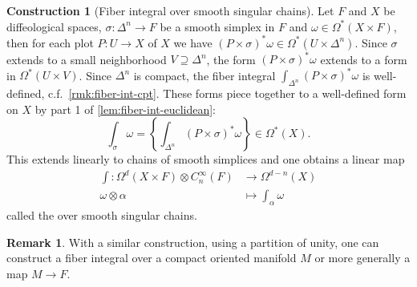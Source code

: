 \documentclass{scrartcl}
\let\emph\relax
\theoremstyle{plain}
\theoremstyle{definition}
\newtheorem{remark}[theorem]{Remark}
\newtheorem{construction}[theorem]{Construction}
\newcommand{\R}{\mathbb R}
\renewcommand{\subset}{\subseteq}
\renewcommand{\supset}{\supseteq}
\begin{document}


\begin{construction}[Fiber integral over smooth singular chains]
    Let $F$ and $X$ be diffeological spaces, $\sigma\colon\Delta^n\to F$ be a smooth simplex in $F$ and $\omega\in\Omega^*(X\times F)$, then for each plot $P\colon U\to X$ of $X$ we have $(P\times\sigma)^*\omega\in\Omega^*(U\times \Delta^n)$. Since $\sigma$ extends to a small neighborhood $V\supset \Delta^n$, the form $(P\times\sigma)^*\omega$ extends to a form in $\Omega^*(U\times V)$. Since $\Delta^n$ is compact, the fiber integral $\int_{\Delta^n} (P\times\sigma)^*\omega$ is well-defined, c.f.\ \cref{rmk:fiber-int-cpt}. These forms piece together to a well-defined form on $X$ by part 1 of \cref{lem:fiber-int-euclidean}: 
    $$\int_\sigma \omega = \left\{\int_{\Delta^n} (P\times\sigma)^*\omega\right\}\in\Omega^*(X).$$
    This extends linearly to chains of smooth simplices and one obtains a linear map
    \begin{align*} \int\colon\Omega^d(X\times F) \otimes C_n^\infty(F)&\to\Omega^{d-n}(X)\\
        \omega\otimes \alpha&\mapsto \int_\alpha\omega
    \end{align*}
    called the \emph{fiber integral} over smooth singular chains.
\end{construction}

\begin{remark}
    With a similar construction, using a partition of unity, one can construct a fiber integral over a compact oriented manifold $M$ or more generally a map $M\to F$.
\end{remark}
\end{document}
